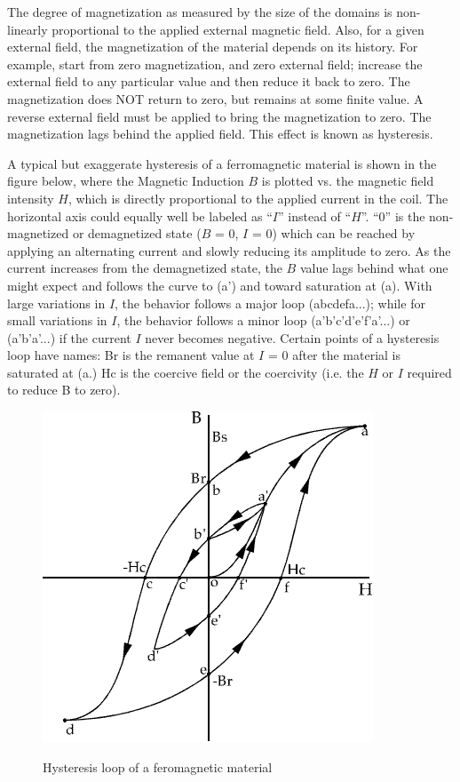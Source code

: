 \documentclass{../lab}
\begin{document}
The degree of magnetization as measured by the size of the domains is non-linearly proportional to the applied external magnetic field. Also, for a given external field, the magnetization of the material depends on its history. For example, start from zero magnetization, and zero external field; increase the external field to any particular value and then reduce it back to zero. The magnetization does NOT return to zero, but remains at some finite value. A reverse external field must be applied to bring the magnetization to zero. The magnetization lags behind the applied field. This effect is known as hysteresis.

A typical but exaggerate hysteresis of a ferromagnetic material is shown in the figure below, where the Magnetic Induction $B$ is plotted vs. the magnetic field intensity $H$, which is directly proportional to the applied current in the coil. The horizontal axis could equally well be labeled as ``$I$'' instead of ``$H$''. ``0'' is the non-magnetized or demagnetized state ($B$ = 0, $I$ = 0) which can be reached by applying an alternating current and slowly reducing its amplitude to zero. As the current increases from the demagnetized state, the $B$ value lags behind what one might expect and follows the curve to (a') and toward saturation at (a). With large variations in $I$, the behavior follows a major loop (abcdefa...); while for small variations in $I$, the behavior follows a minor loop (a'b'c'd'e'f'a'...) or (a'b'a'...) if the current $I$ never becomes negative. Certain points of a hysteresis loop have names: Br is the remanent value at $I$ = 0 after the material is saturated at (a.) Hc is the coercive field or the coercivity (i.e. the $H$ or $I$ required to reduce B to zero).

\begin{figure}[h]
    \centering
    \href{http://experimentationlab.berkeley.edu/sites/default/files/images/BRAimage026.gif}{\includegraphics[width=0.5\linewidth]{images/BRAimage026.png}}
    \caption{Hysteresis loop of a feromagnetic material}
    \label{fig:BRAimage026}
\end{figure}
\end{document}
